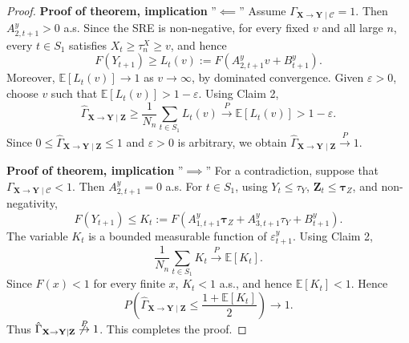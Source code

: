 \documentclass[a4paper,11pt]{article}
\begin{document}
\begin{proof}
\textbf{Proof of theorem, implication} ''$\impliedby$'' Assume
\(\Gamma_{\mathbf X\to\mathbf Y\mid\mathcal C}=1\). Then
\(A^y_{2,t+1}>0\) a.s. Since the SRE is non-negative, for every fixed \(v\) and all large
\(n\), every \(t\in S_1\) satisfies \(X_t\ge\tau_n^X\ge v\), and hence
\[
    F(Y_{t+1})
    \ge
    L_t(v):=F(A^y_{2,t+1}v+B^y_{t+1}).
\]
Moreover, \(\mathbb{E}[L_t(v)]\to1\) as \(v\to\infty\), by dominated convergence. Given
\(\varepsilon>0\), choose \(v\) such that \(\mathbb{E}[L_t(v)]>1-\varepsilon\). Using Claim 2,
\[
    \hat{\Gamma}_{\mathbf X\to\mathbf Y\mid\mathbf Z}
    \ge
    \frac1{N_n}\sum_{t\in S_1}L_t(v)
    \overset{P}{\to}
    \mathbb{E}[L_t(v)]>1-\varepsilon .
\]
Since \(0\le\hat{\Gamma}_{\mathbf X\to\mathbf Y\mid\mathbf Z}\le1\) and \(\varepsilon>0\) is arbitrary, we obtain
\(
    \hat{\Gamma}_{\mathbf X\to\mathbf Y\mid\mathbf Z}
    \overset{P}{\to}1 .
\)


\textbf{Proof of theorem, implication} ''$\implies$''  For a contradiction, suppose that
\(\Gamma_{\mathbf X\to\mathbf Y\mid\mathcal C}<1\). Then \(A^y_{2,t+1}=0\) a.s. For
\(t\in S_1\), using \(Y_t\le\tau_Y\), \(\mathbf Z_t\le\boldsymbol{\tau}_Z\), and
non-negativity,
\[
    F(Y_{t+1})
    \le
    K_t:=
    F(A^y_{1,t+1}\boldsymbol{\tau}_Z
      +A^y_{3,t+1}\tau_Y
      +B^y_{t+1}).
\]
The variable \(K_t\) is a bounded measurable function of \(\varepsilon^y_{t+1}\). Using
Claim 2,
\[
    \frac1{N_n}\sum_{t\in S_1}K_t
    \overset{P}{\to}
    \mathbb{E}[K_t].
\]
Since \(F(x)<1\) for every finite \(x\), \(K_t<1\) a.s., and hence \(\mathbb{E}[K_t]<1\). Hence
\[
    P\left(
        \hat{\Gamma}_{\mathbf X\to\mathbf Y\mid\mathbf Z}\le \frac{1+\mathbb{E}[K_t]}{2} 
    \right)\to1 .
\]
Thus \(\hat{\Gamma}_{\mathbf X\to\mathbf Y\mid\mathbf Z}\not\overset{P}{\to}1\). This completes the proof.
\end{proof}
\end{document}
